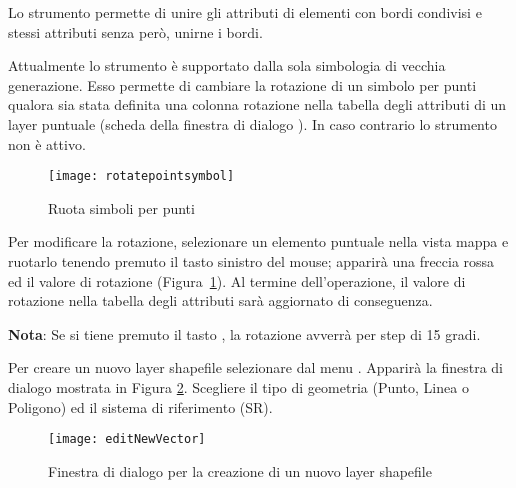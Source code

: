 
Lo strumento  
permette di unire gli attributi di elementi con bordi condivisi e stessi attributi senza però, 
unirne i bordi.


Attualmente lo strumento  è 
supportato dalla sola simbologia di vecchia generazione. Esso permette di cambiare la rotazione
di un simbolo per punti qualora sia stata definita una colonna rotazione nella tabella degli 
attributi di un layer puntuale (scheda  della finestra di dialogo ). 
In caso contrario lo strumento non è attivo.

\begin{figure}[ht]
   \centering
   \texttt{[image: rotatepointsymbol]}
   \caption{Ruota simboli per punti \nixcaption}\label{fig:rotatepoint}
\end{figure}

Per modificare la rotazione, selezionare un elemento puntuale nella vista mappa e ruotarlo 
tenendo premuto il tasto sinistro del mouse; apparirà una freccia rossa ed il valore di 
rotazione (Figura~\ref{fig:rotatepoint}). Al termine dell'operazione, il valore di rotazione
nella tabella degli attributi sarà aggiornato di conseguenza.

\textbf{Nota}: Se si tiene premuto il tasto , la rotazione avverrà per step di 15 gradi.

\label{sec:create shape}

Per creare un nuovo layer shapefile selezionare  \arrow
{} dal menu 
. Apparirà la finestra di dialogo  mostrata
in Figura \ref{fig:newvectorlayer}. Scegliere il tipo di geometria (Punto, Linea o Poligono) 
ed il sistema di riferimento (SR).

\begin{figure}[ht]
   \centering
   \texttt{[image: editNewVector]}
   \caption{Finestra di dialogo per la creazione di un nuovo layer shapefile \nixcaption}\label{fig:newvectorlayer}
\end{figure}

